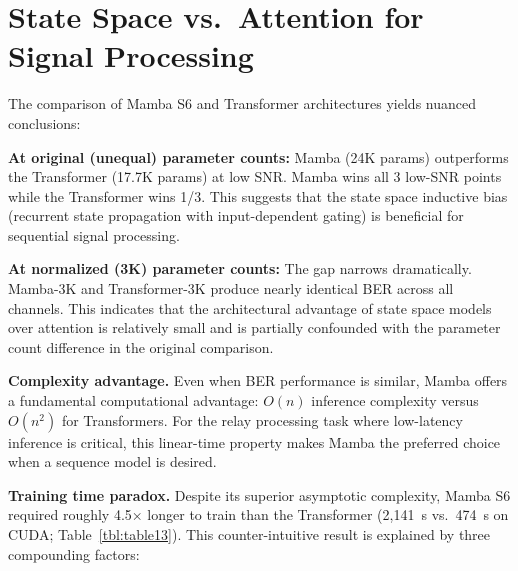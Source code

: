 \section{State Space vs.~Attention for Signal Processing}\label{sec:state-space-vs.-attention-for-signal-processing}

The comparison of Mamba S6 and Transformer architectures yields nuanced conclusions:

\textbf{At original (unequal) parameter counts:} Mamba (24K params) outperforms the Transformer (17.7K params) at low SNR. Mamba wins all 3 low-SNR points while the Transformer wins 1/3. This suggests that the state space inductive bias (recurrent state propagation with input-dependent gating) is beneficial for sequential signal processing.

\textbf{At normalized (3K) parameter counts:} The gap narrows dramatically. Mamba-3K and Transformer-3K produce nearly identical BER across all channels. This indicates that the architectural advantage of state space models over attention is relatively small and is partially confounded with the parameter count difference in the original comparison.

\textbf{Complexity advantage.} Even when BER performance is similar, Mamba offers a fundamental computational advantage: \(O(n)\) inference complexity versus \(O(n^2)\) for Transformers. For the relay processing task where low-latency inference is critical, this linear-time property makes Mamba the preferred choice when a sequence model is desired.

\textbf{Training time paradox.} Despite its superior asymptotic complexity, Mamba S6 required roughly 4.5× longer to train than the Transformer (2{,}141~s vs.~474~s on CUDA; Table~\ref{tbl:table13}). This counter-intuitive result is explained by three compounding factors:

